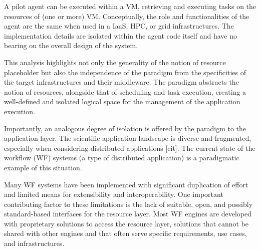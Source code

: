 \documentclass{sig-alternate}
\begin{document}
A pilot agent can be executed within a VM, retrieving and executing tasks on the
resources of (one or more) VM.  Conceptually, the role and functionalities of
the \pilot agent are the same when used in a IaaS, HPC, or grid infrastructures.
The implementation details are isolated within the agent code itself and have no
bearing on the overall design of the \pilot system.

This analysis highlights not only the generality of the notion of resource
placeholder but also the independence of the \pilot paradigm from the
specificities of the target infrastructures and their middleware. The \pilot
paradigm abstracts the notion of resources, alongside that of scheduling and
task execution, creating a well-defined and isolated logical space for the
management of the application execution.




Importantly, an analogous degree of isolation is offered by the \pilot paradigm
to the application layer. The scientific application landscape is diverse and
fragmented, especially when considering distributed applications [cit]. The
current state of the workflow (WF) systems (a type of distributed application)
is a paradigmatic example of this situation.

Many WF systems have been implemented with significant duplication of effort and
limited means for extensibility and interoperability. One important contributing
factor to these limitations is the lack of suitable, open, and possibly
standard-based interfaces for the resource layer. Most WF engines are developed
with proprietary solutions to access the resource layer, solutions that cannot
be shared with other engines and that often serve specific requirements, use
cases, and infrastructures.
\end{document}
